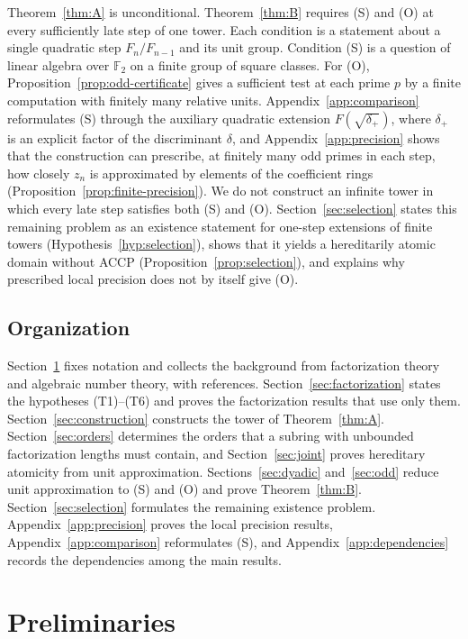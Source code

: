 \documentclass[11pt]{article}
\theoremstyle{plain}
\theoremstyle{definition}
\theoremstyle{remark}
\newcommand{\F}{\mathbb F}
\begin{document}
Theorem~\ref{thm:A} is unconditional.  Theorem~\ref{thm:B} requires (S)
and (O) at every sufficiently late step of one tower.  Each condition is a
statement about a single quadratic step $F_n/F_{n-1}$ and its unit group.
Condition (S) is a question of linear algebra over $\F_2$ on a finite group
of square classes.  For (O), Proposition~\ref{prop:odd-certificate} gives
a sufficient test at each prime $p$ by a finite computation with finitely
many relative units.  Appendix~\ref{app:comparison} reformulates (S)
through the auxiliary quadratic extension $F(\sqrt{\delta_+})$, where
$\delta_+$ is an explicit factor of the discriminant $\delta$, and
Appendix~\ref{app:precision} shows that the construction can prescribe, at
finitely many odd primes in each step, how closely $z_n$ is approximated by
elements of the coefficient rings (Proposition~\ref{prop:finite-precision}).
We do not construct an infinite tower in which every late step satisfies
both (S) and (O).  Section~\ref{sec:selection} states this remaining
problem as an existence statement for one-step extensions of finite towers
(Hypothesis~\ref{hyp:selection}), shows that it yields a hereditarily
atomic domain without ACCP (Proposition~\ref{prop:selection}), and explains
why prescribed local precision does not by itself give (O).

\subsection{Organization}\label{sec:intro-organization}

Section~\ref{sec:preliminaries} fixes notation and collects the background
from factorization theory and algebraic number theory, with references.
Section~\ref{sec:factorization} states the hypotheses (T1)--(T6) and
proves the factorization results that use only them.
Section~\ref{sec:construction} constructs the tower of
Theorem~\ref{thm:A}.  Section~\ref{sec:orders} determines the orders that a
subring with unbounded factorization lengths must contain, and
Section~\ref{sec:joint} proves hereditary atomicity from unit
approximation.  Sections~\ref{sec:dyadic} and~\ref{sec:odd} reduce unit
approximation to (S) and (O) and prove Theorem~\ref{thm:B}.
Section~\ref{sec:selection} formulates the remaining existence problem.
Appendix~\ref{app:precision} proves the local precision results,
Appendix~\ref{app:comparison} reformulates (S), and
Appendix~\ref{app:dependencies} records the dependencies among the main
results.

\section{Preliminaries}\label{sec:preliminaries}
\end{document}
